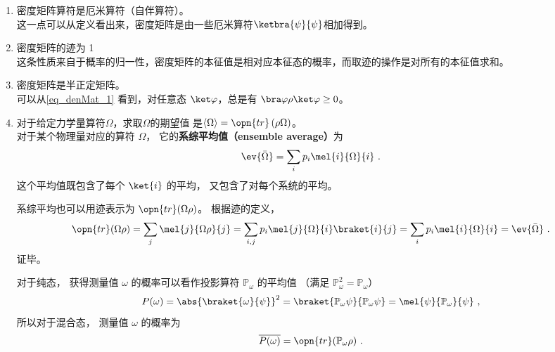 \begin{enumerate}

\item 密度矩阵算符是厄米算符（自伴算符）。\\

这一点可以从定义看出来，密度矩阵是由一些厄米算符$\ketbra{\psi}{\psi}$相加得到。

\item 密度矩阵的迹为 1 \\

这条性质来自于概率的归一性，密度矩阵的本征值是相对应本征态的概率，而取迹的操作是对所有的本征值求和。

\item 密度矩阵是半正定矩阵。 \\可以从\autoref{eq_denMat_1} 看到，对任意态 $\ket\varphi$，总是有 
    $\bra\varphi \rho \ket\varphi\ge 0$。
\item 对于给定力学量算符$\Omega$，求取$\Omega$的期望值
    是$\left\langle \Omega \right\rangle = \opn{tr}\left(\rho\Omega\right)$。\\
    
    对于某个物理量对应的算符 $\Omega$， 它的\textbf{系综平均值（ensemble average）}为
    \begin{equation}
    \ev{\bar\Omega} = \sum_i p_i \mel{i}{\Omega}{i}~.
    \end{equation}
    这个平均值既包含了每个 $\ket{i}$ 的平均， 又包含了对每个系统的平均。

    系综平均也可以用迹表示为 $\opn{tr}(\Omega\rho)$。 根据迹的定义，
    \begin{equation}\label{eq_denMat_3}
    \opn{tr}(\Omega\rho) = \sum_j \mel{j}{\Omega\rho}{j} = \sum_{i,j} p_i\mel{j}{\Omega}{i} \braket{i}{j} = \sum_{i} p_i\mel{i}{\Omega}{i} = \ev{\bar\Omega}~.
    \end{equation}
    证毕。

    对于纯态， 获得测量值 $\omega$ 的概率可以看作投影算符 $\mathbb P_\omega$ 的平均值
    （满足 $\mathbb P_\omega^2 = \mathbb P_\omega$）
    \begin{equation}
    P(\omega) = \abs{\braket{\omega}{\psi}}^2 = \braket{\mathbb P_\omega \psi}{\mathbb P_\omega \psi} = \mel{\psi}{\mathbb P_\omega}{\psi}~,
    \end{equation}
    所以对于混合态， 测量值 $\omega$ 的概率为
    \begin{equation}
\overline{P(\omega)} = \opn{tr}(\mathbb P_\omega\rho)~.
\end{equation}


\end{enumerate}
